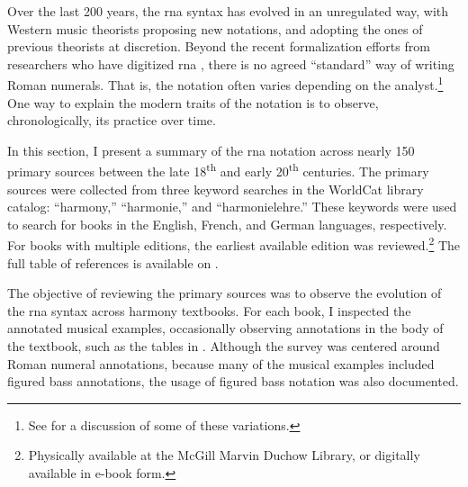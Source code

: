 

Over the last 200 years, the \gls{rna} syntax has evolved in
an unregulated way, with Western music theorists proposing
new notations, and adopting the ones of previous theorists
at discretion. Beyond the recent formalization efforts from
researchers who have digitized \gls{rna}
\parencite{huron1994humdrum, napoleslopez2017automatic,
neuwirth2018annotated, gotham2019romantext,
napoleslopez2020harmalysis, hentschel2021annotated,
hentschel2022towards}, there is no agreed ``standard'' way
of writing Roman numerals. That is, the notation often
varies depending on the analyst.\footnote{See
 for a
discussion of some of these variations.} One way to explain
the modern traits of the notation is to observe,
chronologically, its practice over time.

In this section, I present a summary of the \gls{rna}
notation across nearly 150 primary sources between the late
18\textsuperscript{th} and early 20\textsuperscript{th}
centuries. The primary sources were collected from three
keyword searches in the
WorldCat library
catalog: ``harmony,'' ``harmonie,'' and ``harmonielehre.''
These keywords were used to search for books in the English,
French, and German languages, respectively. For books with
multiple editions, the earliest available edition was
reviewed.\footnote{Physically available at the McGill Marvin
Duchow Library, or digitally available in e-book form.} The
full table of references is available on
.


The objective of reviewing the primary sources was to
observe the evolution of the \gls{rna} syntax across harmony
textbooks. For each book, I inspected the annotated musical
examples, occasionally observing annotations in the body of
the textbook, such as the tables in
. Although
the survey was centered around Roman numeral annotations,
because many of the musical examples included figured bass
annotations, the usage of figured bass notation was also
documented. 
